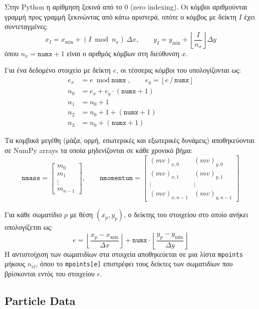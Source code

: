 \documentclass[12pt,a4paper]{report}
\begin{document}
	Στην Python η αρίθμηση ξεκινά από το 0 (zero indexing). Οι κόμβοι αριθμούνται γραμμή προς γραμμή ξεκινώντας από κάτω αριστερά, οπότε ο κόμβος με δείκτη $I$ έχει συντεταγμένες:
	\[
	x_I = x_{\min} + (I \bmod n_x)\,\Delta x, \qquad
	y_I = y_{\min} + \left\lfloor \frac{I}{n_x} \right\rfloor \Delta y
	\]
	όπου $n_x = \texttt{numx}+1$ είναι ο αριθμός κόμβων στη διεύθυνση $x$.

	Για ένα δεδομένο στοιχείο με δείκτη $e$, οι τέσσερις κόμβοι του υπολογίζονται ως:
	\begin{align*}
		e_x &= e \bmod \texttt{numx}, \qquad e_y = \left\lfloor e \,/\, \texttt{numx} \right\rfloor \\[4pt]
		n_0 &= e_x + e_y \cdot (\texttt{numx}+1) \\
		n_1 &= n_0 + 1 \\
		n_2 &= n_0 + 1 + (\texttt{numx}+1) \\
		n_3 &= n_0 + (\texttt{numx}+1)
	\end{align*}

	Τα κομβικά μεγέθη (μάζα, ορμή, εσωτερικές και εξωτερικές δυνάμεις) αποθηκεύονται σε NumPy arrays τα οποία μηδενίζονται σε κάθε χρονικό βήμα:
	\[
	\texttt{nmass} =
	\begin{bmatrix} m_0 \\ m_1 \\ \vdots \\ m_{n-1} \end{bmatrix},
	\qquad
	\texttt{nmomentum} =
	\begin{bmatrix}
		(mv)_{x,0} & (mv)_{y,0} \\
		(mv)_{x,1} & (mv)_{y,1} \\
		\vdots & \vdots \\
		(mv)_{x,n-1} & (mv)_{y,n-1}
	\end{bmatrix}
	\]

	Για κάθε σωματίδιο $p$ με θέση $(x_p, y_p)$, ο δείκτης του στοιχείου στο οποίο ανήκει υπολογίζεται ως:
	\begin{equation}\label{eq:p2e}
		e = \left\lfloor \frac{x_p - x_{\min}}{\Delta x} \right\rfloor + \texttt{numx} \cdot \left\lfloor \frac{y_p - y_{\min}}{\Delta y} \right\rfloor
	\end{equation}
	Η αντιστοίχιση των σωματιδίων στα στοιχεία αποθηκεύεται σε μια λίστα \texttt{mpoints} μήκους $n_{el}$, όπου το \texttt{mpoints[e]} επιστρέφει τους δείκτες των σωματιδίων που βρίσκονται εντός του στοιχείου $e$.

	\subsection{Particle Data}
\end{document}
